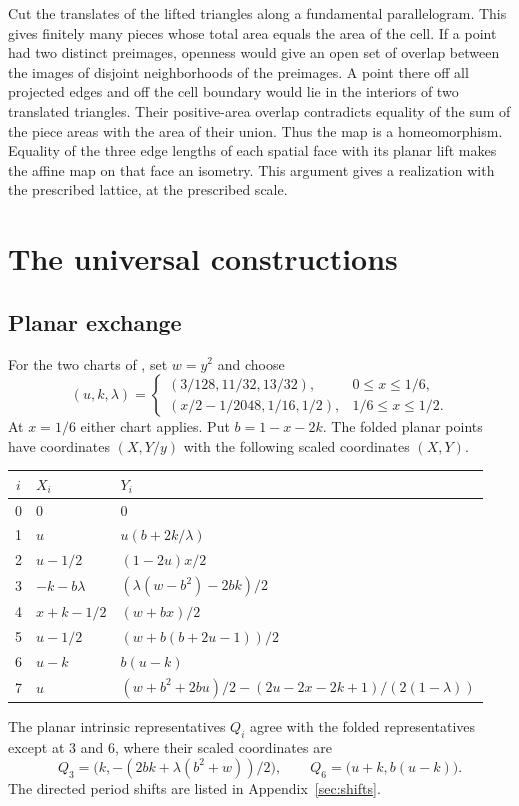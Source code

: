 \documentclass[11pt,letterpaper]{amsart}
\begin{document}
Cut the translates of the lifted triangles along a fundamental
parallelogram. This gives finitely many pieces whose total area
equals the area of the cell. If a point had two distinct preimages,
openness would give an open set of overlap between the images of
disjoint neighborhoods of the preimages. A point there off all
projected edges and off the cell boundary would lie in the interiors
of two translated triangles. Their positive-area overlap contradicts
equality of the sum of the piece areas with the area of their
union. Thus the map is a homeomorphism. Equality of the three edge
lengths of each spatial face with its planar lift makes the affine
map on that face an isometry. This argument gives a realization with
the prescribed lattice, at the prescribed scale.

\section{The universal constructions}\label{sec:universality}

\subsection*{Planar exchange}

For the two charts of \cite[\S3]{dlst}, set \(w=y^2\) and choose
\[
 (u,k,\lambda)=
 \begin{cases}
 (3/128,11/32,13/32),&0\le x\le1/6,\\
 (x/2-1/2048,1/16,1/2),&1/6\le x\le1/2.
 \end{cases}
\]
At \(x=1/6\) either chart applies. Put \(b=1-x-2k\).
The folded planar points have coordinates \((X,Y/y)\) with the
following scaled coordinates \((X,Y)\).
\begin{center}
\begin{tabular}{@{}cll@{}}
\toprule
\(i\)&\(X_i\)&\(Y_i\)\\
\midrule
0 & \(0\) & \(0\)\\
1 & \(u\) & \(u(b+2k/\lambda)\)\\
2 & \(u-1/2\) & \((1-2u)x/2\)\\
3 & \(-k-b\lambda\) & \((\lambda(w-b^2)-2bk)/2\)\\
4 & \(x+k-1/2\) & \((w+bx)/2\)\\
5 & \(u-1/2\) & \((w+b(b+2u-1))/2\)\\
6 & \(u-k\) & \(b(u-k)\)\\
7 & \(u\) & \((w+b^2+2bu)/2-(2u-2x-2k+1)/(2(1-\lambda))\)\\
\bottomrule
\end{tabular}
\end{center}
The planar intrinsic representatives \(Q_i\) agree with the
folded representatives except at \(3\) and \(6\), where their
scaled coordinates are
\[
 Q_3=\bigl(k,-(2bk+\lambda(b^2+w))/2\bigr),\qquad
 Q_6=\bigl(u+k,b(u-k)\bigr).
\]
The directed period shifts are listed in
Appendix~\ref{sec:shifts}.
\end{document}

